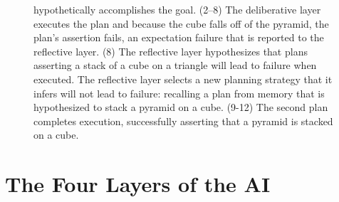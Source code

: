 \begin{figure}
{  hypothetically accomplishes the goal.  (2--8) The deliberative layer
  executes the plan and because the cube falls off of the pyramid, the
  plan's assertion fails, an expectation failure that is reported to
  the reflective layer.  (8) The reflective layer hypothesizes that
  plans asserting a stack of a cube on a triangle will lead to failure
  when executed.  The reflective layer selects a new planning strategy
  that it infers will not lead to failure: recalling a plan from
  memory that is hypothesized to stack a pyramid on a cube.  (9-12)
  The second plan completes execution, successfully asserting that a
  pyramid is stacked on a cube.}
\label{figure:implemented_example_learning_storyboard}
\end{figure}

\section{The Four Layers of the AI}

